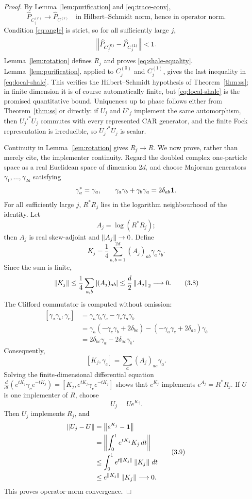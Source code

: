 \begin{proof}
By Lemma~\ref{lem:purification} and \eqref{eq:trace-conv},
\[
 \widehat P_{C_j^{(r)}}\longrightarrow\widehat P_{C^{(r)}}
 \quad\text{in Hilbert--Schmidt norm, hence in operator norm}.
\]
Condition \eqref{eq:angle} is strict, so for all sufficiently large $j$,
\[
 \left\lVert \widehat P_{C_j^{(0)}}-\widehat P_{C_j^{(1)}}\right\rVert<1.
\]
Lemma~\ref{lem:rotation} defines $R_j$ and proves
\eqref{eq:shale-equality}.  Lemma~\ref{lem:purification}, applied to
$C_j^{(0)}$ and $C_j^{(1)}$, gives the last inequality in
\eqref{eq:local-shale}.  This verifies the Hilbert--Schmidt hypothesis of
Theorem~\ref{thm:ss}; in finite dimension it is of course automatically
finite, but \eqref{eq:local-shale} is the promised quantitative bound.
Uniqueness up to phase follows either from Theorem~\ref{thm:ss} or
directly: if $U_j$ and $U'_j$ implement the same automorphism, then
$U_j'^*U_j$ commutes with every represented CAR generator, and the
finite Fock representation is irreducible, so $U_j'^*U_j$ is scalar.

Continuity in Lemma~\ref{lem:rotation} gives $R_j\to R$.  We now prove,
rather than merely cite, the implementer continuity.  Regard the doubled
complex one-particle space as a real Euclidean space of dimension $2d$,
and choose Majorana generators
$\gamma_1,\ldots,\gamma_{2d}$ satisfying
\[
 \gamma_a^*=\gamma_a,\qquad
 \gamma_a\gamma_b+\gamma_b\gamma_a=2\delta_{ab}\mathbf 1 .
\]
For all sufficiently large $j$, $R^*R_j$ lies in the logarithm
neighbourhood of the identity.  Let
\[
 A_j=\log(R^*R_j);
\]
then $A_j$ is real skew-adjoint and $\left\lVert A_j\right\rVert\to0$.  Define
\[
 K_j=\frac14\sum_{a,b=1}^{2d}(A_j)_{ab}\gamma_a\gamma_b.
\]
Since the sum is finite,
\[
 \left\lVert K_j\right\rVert
 \le\frac14\sum_{a,b}|(A_j)_{ab}|
 \le \frac{d}{2}\left\lVert A_j\right\rVert_2
 \longrightarrow0.
\tag{3.8}\label{eq:spin-bound}
\]
The Clifford commutator is computed without omission:
\[
\begin{aligned}
[\gamma_a\gamma_b,\gamma_c]
&=\gamma_a\gamma_b\gamma_c-\gamma_c\gamma_a\gamma_b\\
&=\gamma_a(-\gamma_c\gamma_b+2\delta_{bc})
 -(-\gamma_a\gamma_c+2\delta_{ac})\gamma_b\\
&=2\delta_{bc}\gamma_a-2\delta_{ac}\gamma_b.
\end{aligned}
\]
Consequently,
\[
 [K_j,\gamma_c]
 =\sum_a(A_j)_{ac}\gamma_a.
\]
Solving the finite-dimensional differential equation
$\frac d{dt}(e^{tK_j}\gamma_ce^{-tK_j})
 =[K_j,e^{tK_j}\gamma_ce^{-tK_j}]$
shows that $e^{K_j}$ implements $e^{A_j}=R^*R_j$.
If $U$ is one implementer of $R$, choose
\[
 U_j=Ue^{K_j}.
\]
Then $U_j$ implements $R_j$, and
\[
\begin{aligned}
\left\lVert U_j-U\right\rVert
 &=\left\lVert e^{K_j}-\mathbf 1\right\rVert\\
 &=\left\lVert \int_0^1 e^{tK_j}K_j\,dt\right\rVert\\
 &\le\int_0^1e^{t\left\lVert K_j\right\rVert}\left\lVert K_j\right\rVert\,dt\\
 &\le e^{\left\lVert K_j\right\rVert}\left\lVert K_j\right\rVert\longrightarrow0.
\end{aligned}
\tag{3.9}\label{eq:implementer-norm}
\]
This proves operator-norm convergence.


\end{proof}
